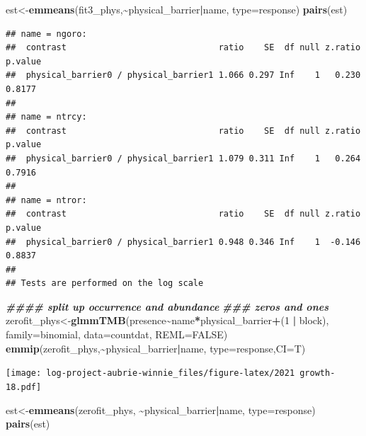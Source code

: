 \documentclass[
]{article}
\newenvironment{Shaded}{\begin{snugshade}}{\end{snugshade}}
\newcommand{\AttributeTok}[1]{\textcolor[rgb]{0.13,0.29,0.53}{#1}}
\newcommand{\ConstantTok}[1]{\textcolor[rgb]{0.56,0.35,0.01}{#1}}
\newcommand{\DecValTok}[1]{\textcolor[rgb]{0.00,0.00,0.81}{#1}}
\newcommand{\DocumentationTok}[1]{\textcolor[rgb]{0.56,0.35,0.01}{\textbf{\textit{#1}}}}
\newcommand{\FunctionTok}[1]{\textcolor[rgb]{0.13,0.29,0.53}{\textbf{#1}}}
\newcommand{\NormalTok}[1]{#1}
\newcommand{\OtherTok}[1]{\textcolor[rgb]{0.56,0.35,0.01}{#1}}
\newcommand{\SpecialCharTok}[1]{\textcolor[rgb]{0.81,0.36,0.00}{\textbf{#1}}}
\newcommand{\StringTok}[1]{\textcolor[rgb]{0.31,0.60,0.02}{#1}}
\begin{document}
\begin{Shaded}
\begin{Highlighting}[]
\NormalTok{est}\OtherTok{\textless{}{-}}\FunctionTok{emmeans}\NormalTok{(fit3\_phys,}\SpecialCharTok{\textasciitilde{}}\NormalTok{physical\_barrier}\SpecialCharTok{|}\NormalTok{name, }\AttributeTok{type=}\StringTok{\textquotesingle{}response\textquotesingle{}}\NormalTok{)}
\FunctionTok{pairs}\NormalTok{(est)}
\end{Highlighting}
\end{Shaded}

\begin{verbatim}
## name = ngoro:
##  contrast                              ratio    SE  df null z.ratio p.value
##  physical_barrier0 / physical_barrier1 1.066 0.297 Inf    1   0.230  0.8177
## 
## name = ntrcy:
##  contrast                              ratio    SE  df null z.ratio p.value
##  physical_barrier0 / physical_barrier1 1.079 0.311 Inf    1   0.264  0.7916
## 
## name = ntror:
##  contrast                              ratio    SE  df null z.ratio p.value
##  physical_barrier0 / physical_barrier1 0.948 0.346 Inf    1  -0.146  0.8837
## 
## Tests are performed on the log scale
\end{verbatim}

\begin{Shaded}
\begin{Highlighting}[]
\DocumentationTok{\#\#\#\# split up occurrence and abundance}
\DocumentationTok{\#\#\# zeros and ones }
\NormalTok{zerofit\_phys}\OtherTok{\textless{}{-}}\FunctionTok{glmmTMB}\NormalTok{(presence}\SpecialCharTok{\textasciitilde{}}\NormalTok{name}\SpecialCharTok{*}\NormalTok{physical\_barrier}\SpecialCharTok{+}\NormalTok{(}\DecValTok{1} \SpecialCharTok{|}\NormalTok{ block), }\AttributeTok{family=}\NormalTok{binomial, }\AttributeTok{data=}\NormalTok{countdat, }\AttributeTok{REML=}\ConstantTok{FALSE}\NormalTok{)}
\FunctionTok{emmip}\NormalTok{(zerofit\_phys,}\SpecialCharTok{\textasciitilde{}}\NormalTok{physical\_barrier}\SpecialCharTok{|}\NormalTok{name, }\AttributeTok{type=}\StringTok{\textquotesingle{}response\textquotesingle{}}\NormalTok{,}\AttributeTok{CI=}\NormalTok{T)}
\end{Highlighting}
\end{Shaded}

\texttt{[image: log-project-aubrie-winnie\_files/figure-latex/2021 growth-18.pdf]}

\begin{Shaded}
\begin{Highlighting}[]
\NormalTok{est}\OtherTok{\textless{}{-}}\FunctionTok{emmeans}\NormalTok{(zerofit\_phys, }\SpecialCharTok{\textasciitilde{}}\NormalTok{physical\_barrier}\SpecialCharTok{|}\NormalTok{name, }\AttributeTok{type=}\StringTok{\textquotesingle{}response\textquotesingle{}}\NormalTok{)}
\FunctionTok{pairs}\NormalTok{(est)}
\end{Highlighting}
\end{Shaded}
\end{document}
